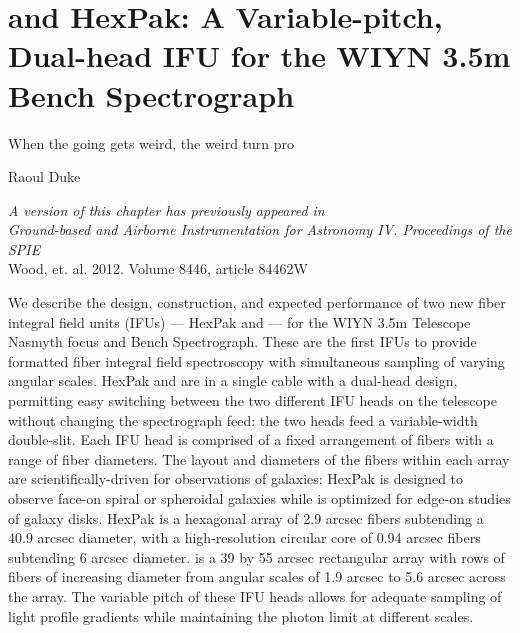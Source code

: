 \chapter[\GP Construction]{\GP and HexPak: A Variable-pitch, Dual-head IFU for the WIYN 3.5m Bench Spectrograph}
\label{chap:pak_build}
\epigraph{When the going gets weird, the weird turn pro}{Raoul Duke}


\vfill

\begin{flushright}
  \fixspacing
  \textit{A version of this chapter has previously appeared in\\
    \emph{Ground-based and Airborne Instrumentation for Astronomy IV. Proceedings of the SPIE}}\\
    \vspace{1ex}
    Wood, et. al. 2012. Volume 8446, article 84462W
\end{flushright}

\begin{chabstract}
  We describe the design, construction, and expected performance of two new
  fiber integral field units (IFUs) --- HexPak and \GP --- for the WIYN 3.5m
  Telescope Nasmyth focus and Bench Spectrograph.  These are the first IFUs to
  provide formatted fiber integral field spectroscopy with simultaneous sampling
  of varying angular scales.  HexPak and \GP are in a single cable with a
  dual-head design, permitting easy switching between the two different IFU
  heads on the telescope without changing the spectrograph feed: the two heads
  feed a variable-width double-slit.  Each IFU head is comprised of a fixed
  arrangement of fibers with a range of fiber diameters.  The layout and
  diameters of the fibers within each array are scientifically-driven for
  observations of galaxies: HexPak is designed to observe face-on spiral or
  spheroidal galaxies while \GP is optimized for edge-on studies of galaxy
  disks.  HexPak is a hexagonal array of 2.9 arcsec fibers subtending a 40.9
  arcsec diameter, with a high-resolution circular core of 0.94 arcsec fibers
  subtending 6 arcsec diameter.  \GP is a 39 by 55 arcsec rectangular array
  with rows of fibers of increasing diameter from angular scales of 1.9 arcsec
  to 5.6 arcsec across the array.  The variable pitch of these IFU heads allows
  for adequate sampling of light profile gradients while maintaining the photon
  limit at different scales.
\end{chabstract}
\cleardoublepage


